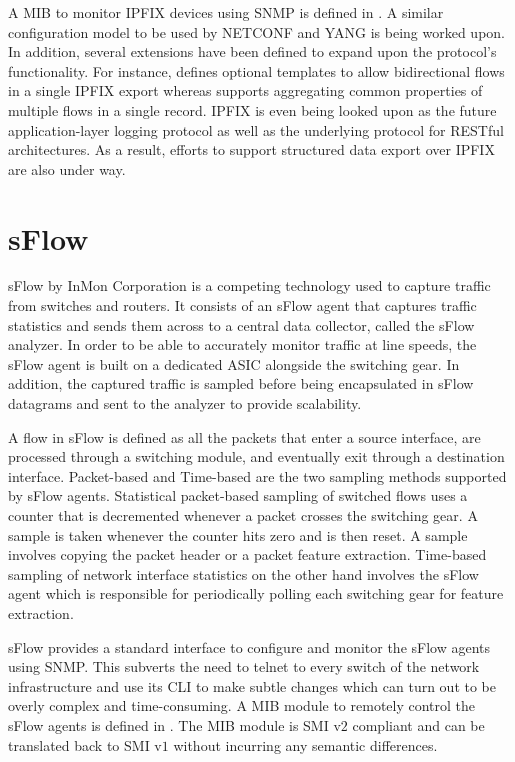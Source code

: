 A \ac{MIB} to monitor \ac{IPFIX} devices using \ac{SNMP} is defined in \cite{rfc5815}. A similar configuration model to be used by NETCONF and YANG is being worked upon. In addition, several extensions have been defined to expand upon the protocol's functionality. For instance, \cite{rfc5103} defines optional templates to allow  bidirectional flows in a single \ac{IPFIX} export whereas \cite{rfc5474} supports aggregating common properties of multiple flows in a single record. \ac{IPFIX} is even being looked upon as the future application-layer logging protocol as well as the underlying protocol for RESTful architectures. As a result, efforts to support structured data export over \ac{IPFIX} are also under way.

\section{sFlow}\label{sec:sflow}
sFlow \cite{rfc3176} by InMon Corporation is a competing technology used to capture traffic from switches and routers. It consists of an sFlow agent that captures traffic statistics and sends them across to a central data collector, called the sFlow analyzer. In order to be able to accurately monitor traffic at line speeds, the sFlow agent is built on a dedicated ASIC alongside the switching gear. In addition, the captured traffic is sampled before being encapsulated in sFlow datagrams and sent to the analyzer to provide scalability.

A flow in sFlow is defined as all the packets that enter a source interface, are processed through a switching module, and eventually exit through a destination interface. Packet-based and Time-based are the two sampling methods supported by sFlow agents. Statistical packet-based sampling of switched flows uses a  counter that is decremented whenever a packet crosses the switching gear. A sample is taken whenever the counter hits zero and is then reset. A sample involves copying the packet header or a packet feature extraction. Time-based sampling of network interface statistics on the other hand involves the sFlow agent which is responsible for periodically polling each switching gear for feature extraction.

sFlow provides a standard interface to configure and monitor the sFlow agents using \ac{SNMP}. This subverts the need to telnet to every switch of the network infrastructure and use its \ac{CLI} to make subtle changes which can turn out to be  overly complex and time-consuming. A \ac{MIB} module to remotely control the sFlow agents is defined in \cite{rfc3176}. The \ac{MIB} module is \ac{SMI} v$2$ compliant and can be translated back to \ac{SMI} v$1$ without incurring any semantic differences.

